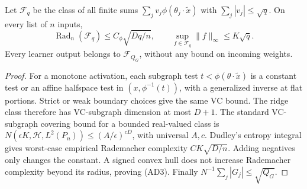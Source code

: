 \begin{lemma}
\label{lem:all-d-ridge-hull}
Let $\mathcal F_q$ be the class of all finite sums
$\sum_j v_j\phi(\theta_j\cdot\widetilde x)$ with
$\sum_j|v_j|\le\sqrt q$. On every list of $n$ inputs,
\[
 \operatorname{Rad}_n(\mathcal F_q)
 \le C_\phi\sqrt{Dq/n},\qquad
 \sup_{f\in\mathcal F_q}\|f\|_\infty\le K\sqrt q.        \tag{AD3}
\]
Every learner output belongs to $\mathcal F_{Q_G}$, without any bound
on incoming weights.
\end{lemma}
\begin{proof}
For a monotone activation, each subgraph test
$t<\phi(\theta\cdot\widetilde x)$ is a constant test or an affine
halfspace test in $(x,\phi^{-1}(t))$, with a generalized inverse at
flat portions. Strict or weak boundary choices give the same VC bound.
The ridge class therefore has VC-subgraph dimension at most $D+1$.
The standard VC-subgraph covering bound for a bounded real-valued class
is $N(\epsilon K,\mathcal H,L^2(P_n))\le(A/\epsilon)^{cD}$,
with universal $A,c$. Dudley's entropy integral gives worst-case
empirical Rademacher complexity $C K\sqrt{D/n}$. Adding negatives
only changes the constant. A signed convex hull does not increase
Rademacher complexity beyond its radius, proving (AD3).
Finally $N^{-1}\sum_j|G_j|\le\sqrt{Q_G}$.
\end{proof}

